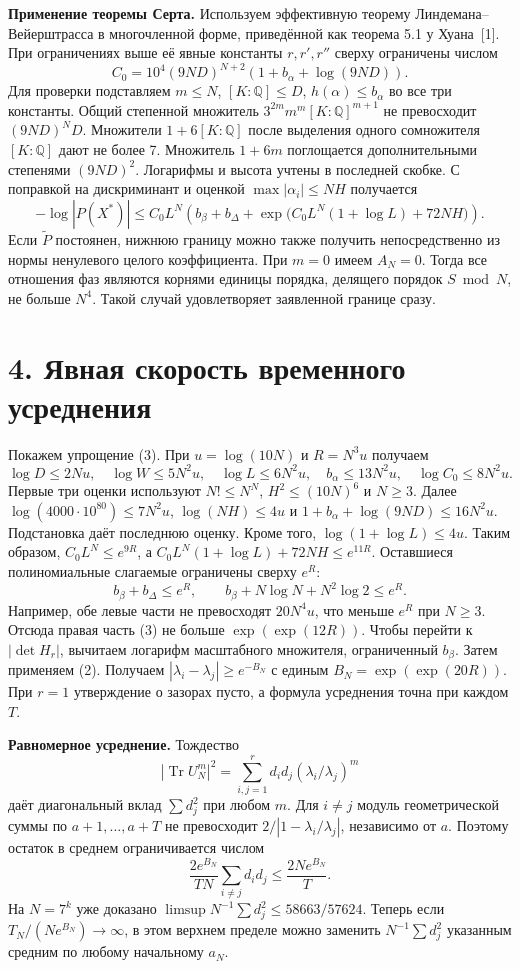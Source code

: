 \documentclass[11pt,a4paper]{article}
\newcommand{\Tr}{\operatorname{Tr}}
\newcommand{\sect}[1]{\section*{\sffamily\color{ink}#1}}
\newcommand{\subt}[1]{\par\medskip\noindent\textbf{#1.}\quad}
\newcommand{\QQ}{\mathbb Q}
\begin{document}
\subt{Применение теоремы Серта}
Используем эффективную теорему Линдемана--Вейерштрасса в многочленной форме, приведённой как теорема 5.1 у Хуана~[1]. При ограничениях выше её явные константы \(r,r',r''\) сверху ограничены числом
\[
                  C_0=10^4(9ND)^{N+2}(1+b_\alpha+\log(9ND)).
\]
Для проверки подставляем \(m\le N\), \([K:\QQ]\le D\), \(h(\alpha)\le b_\alpha\) во все три константы. Общий степенной множитель \(3^{2m}m^m[K:\QQ]^{m+1}\) не превосходит \((9ND)^ND\). Множители \(1+6[K:\QQ]\) после выделения одного сомножителя \([K:\QQ]\) дают не более 7. Множитель \(1+6m\) поглощается дополнительными степенями \((9ND)^2\). Логарифмы и высота учтены в последней скобке. С поправкой на дискриминант и оценкой \(\max|\alpha_i|\le NH\) получается
\begin{equation}
 -\log|P(X^*)|\le C_0 L^N
 \left(b_\beta+b_\Delta+\exp\bigl(C_0 L^N(1+\log L)+72NH\bigr)\right).
                                                        \tag{3}
\end{equation}
Если \(\widetilde P\) постоянен, нижнюю границу можно также получить непосредственно из нормы ненулевого целого коэффициента. При \(m=0\) имеем \(A_N=0\). Тогда все отношения фаз являются корнями единицы порядка, делящего порядок \(S\bmod N\), не больше \(N^4\). Такой случай удовлетворяет заявленной границе сразу.

\newpage
\sect{4. Явная скорость временного усреднения}
Покажем упрощение (3). При \(u=\log(10N)\) и \(R=N^3u\) получаем
\[
 \log D\le2Nu,\quad
 \log W\le5N^2u,\quad
 \log L\le6N^2u,\quad
 b_\alpha\le13N^2u,\quad
 \log C_0\le8N^2u .
\]
Первые три оценки используют \(N!\le N^N\), \(H^2\le (10N)^6\) и \(N\ge3\). Далее \(\log(4000\cdot10^{80})\le7N^2u\), \(\log(NH)\le4u\) и \(1+b_\alpha+\log(9ND)\le16N^2u\). Подстановка даёт последнюю оценку. Кроме того, \(\log(1+\log L)\le4u\). Таким образом, \(C_0L^N\le e^{9R}\), а \(C_0 L^N(1+\log L)+72NH\le e^{11R}\). Оставшиеся полиномиальные слагаемые ограничены сверху \(e^R\):
\[
       b_\beta+b_\Delta\le e^R,\qquad
       b_\beta+N\log N+N^2\log2\le e^R .
\]
Например, обе левые части не превосходят \(20N^4u\), что меньше \(e^R\) при \(N\ge3\). Отсюда правая часть (3) не больше \(\exp(\exp(12R))\). Чтобы перейти к \(|\det H_r|\), вычитаем логарифм масштабного множителя, ограниченный \(b_\beta\). Затем применяем (2). Получаем \(|\lambda_i-\lambda_j|\ge e^{-B_N}\) с единым \(B_N=\exp(\exp(20R))\). При \(r=1\) утверждение о зазорах пусто, а формула усреднения точна при каждом \(T\).

\subt{Равномерное усреднение}
Тождество
\[
      |\Tr U_N^m|^2=\sum_{i,j=1}^r d_i d_j(\lambda_i/\lambda_j)^m
\]
даёт диагональный вклад \(\sum d_j^2\) при любом \(m\). Для \(i\ne j\) модуль геометрической суммы по \(a+1,\ldots,a+T\) не превосходит \(2/|1-\lambda_i/\lambda_j|\), независимо от \(a\). Поэтому остаток в среднем ограничивается числом
\[
      \frac{2e^{B_N}}{TN}\sum_{i\ne j}d_i d_j
                    \le\frac{2Ne^{B_N}}T .
\]
На \(N=7^k\) уже доказано \(\limsup N^{-1}\sum d_j^2\le58663/57624\). Теперь если \(T_N/(N e^{B_N})\to\infty\), в этом верхнем пределе можно заменить \(N^{-1}\sum d_j^2\) указанным средним по любому начальному \(a_N\).
\end{document}
